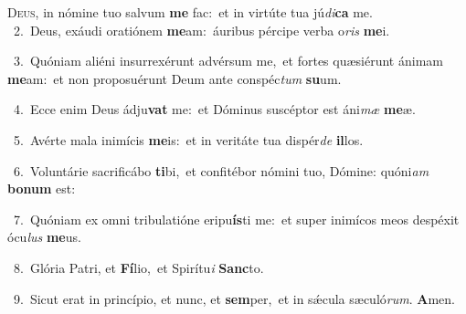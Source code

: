 \lettrine{\initial\textcolor{\initialcolor}{D}}{eus,} in nómine tuo salvum \textbf{me} fac:~\star et in virtúte tua jú\-\textit{di}\-\textbf{ca} me.\\
{\numbfont\textcolor{\numbcolor}{~2.}}~Deus, exáudi oratiónem \textbf{me}\-am:~\star áuribus pércipe verba o\textit{ris} \textbf{me}\-i.\par
{\numbfont\textcolor{\numbcolor}{~3.}}~Quóniam aliéni insurrexérunt advérsum me,~\dagger et fortes quæsiérunt ánimam \textbf{me}\-am:~\star et non proposuérunt Deum ante conspéc\textit{tum} \textbf{su}\-um.\par
{\numbfont\textcolor{\numbcolor}{~4.}}~Ecce enim Deus ádju\textbf{vat} me:~\star et Dóminus suscéptor est áni\textit{mæ} \textbf{me}\-æ.\par
{\numbfont\textcolor{\numbcolor}{~5.}}~Avérte mala inimícis \textbf{me}\-is:~\star et in veritáte tua dispér\textit{de} \textbf{il}\-los.\par
{\numbfont\textcolor{\numbcolor}{~6.}}~Voluntárie sacrificábo \textbf{ti}\-bi,~\star et confitébor nómini tuo, Dómine: quóni\textit{am} \textbf{bo}\-\textbf{num} est:\par
{\numbfont\textcolor{\numbcolor}{~7.}}~Quóniam ex omni tribulatióne eripu\-\textbf{ís}\-ti me:~\star et super inimícos meos despéxit ócu\textit{lus} \textbf{me}\-us.\par
{\numbfont\textcolor{\numbcolor}{~8.}}~Glória Patri, et \textbf{Fí}\-lio,~\star et Spirítu\textit{i} \textbf{Sanc}\-to.\par
{\numbfont\textcolor{\numbcolor}{~9.}}~Sicut erat in princípio, et nunc, et \textbf{sem}\-per,~\star et in sǽcula sæculó\-\textit{rum}\-. \textbf{A}\-men.\par
